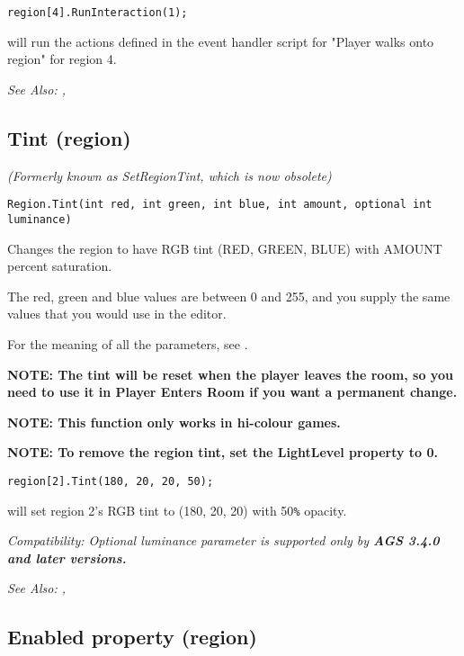 \begin{verbatim}
region[4].RunInteraction(1);
\end{verbatim}
will run the actions defined in the event handler script for "Player walks onto region"
for region 4.

\it{See Also:} ,


\subsection{Tint (region)}\label{Region.Tint}%

\it{(Formerly known as SetRegionTint, which is now obsolete)}

\begin{verbatim}
Region.Tint(int red, int green, int blue, int amount, optional int luminance)
\end{verbatim}
Changes the region to have RGB tint (RED, GREEN, BLUE) with AMOUNT percent
saturation.

The red, green and blue values are between 0 and 255, and you supply the same
values that you would use in the editor.

For the meaning of all the parameters, see .

\bf{NOTE}: The tint will be reset when the player leaves the room,
so you need to use it in Player Enters Room if you want a permanent
change.

\bf{NOTE:} This function only works in hi-colour games.

\bf{NOTE}: To remove the region tint, set the LightLevel property to 0.

\begin{verbatim}
region[2].Tint(180, 20, 20, 50);
\end{verbatim}
will set region 2's RGB tint to (180, 20, 20) with 50\verb$%$ opacity.

\it{Compatibility:} Optional \it{luminance} parameter is supported only by \bf{AGS 3.4.0} and later versions.

\it{See Also:} ,



\subsection{Enabled property (region)}\label{Region.Enabled}%

